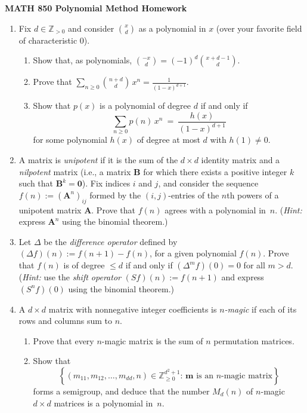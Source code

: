 \documentclass[11pt]{article}
\def\A{\mathbf{A}}
\def\B{\mathbf{B}}
\def\0{\mathbf{0}}
\def\Z{\mathbb{Z}}
\def\m{\mathbf{m}}
\begin{document}
\setlength{\parindent}{0pt}
\setlength{\parskip}{0.4cm}

\thispagestyle{empty} 

\begin{center} {\bf MATH 850 \qquad \qquad Polynomial Method Homework} \end{center} 

\begin{enumerate}[(1)]

\item Fix $d \in \Z_{ >0 }$ and consider $\binom x d$ as a polynomial in $x$ (over your favorite field of characteristic 0).
\begin{enumerate}
  \item Show that, as polynomials, $\binom {-x} d = (-1)^d \binom {x+d-1} d$.
  \item Prove that $\sum_{ n \ge 0 } \binom {n+d} d \, x^n = \frac{ 1 }{ (1-x)^{ d+1 } }$.
  \item Show that $p(x)$ is a polynomial of degree $d$ if and only if
  \[
    \sum_{ n \ge 0 } p(n) \, x^n \ = \ \frac{ h(x) }{ (1-x)^{ d+1 } } 
  \]
  for some polynomial $h(x)$ of degree at most $d$ with $h(1) \ne 0$.
\end{enumerate}

\item A matrix is \emph{unipotent} if it is the sum of the $d \times d$ identity matrix and a \emph{nilpotent}
matrix (i.e., a matrix $\B$ for which there exists a positive integer $k$ such that $\B^k = \0$).
Fix indices $i$ and $j$, and consider the sequence $f(n) := (\A^n)_{ ij }$ formed by the $(i,j)$-entries of the $n$th powers of a unipotent
matrix $\A$. 
Prove that $f(n)$ agrees with a polynomial in~$n$. 
(\emph{Hint:} express $\A^n$ using the binomial theorem.)

\item Let $\Delta$ be the \emph{difference operator} defined by $(\Delta f) (n) := f(n+1) - f(n)$, for a given polynomial $f(n)$.
Prove that $f(n)$ is of degree $\le d$ if and only if $(\Delta^m f)(0) = 0$ for all $m > d$.
(\emph{Hint:} use the \emph{shift operator} $(Sf)(n) := f(n+1)$ and express $(S^n f)(0)$ using the binomial theorem.) 

\item A $d \times d$ matrix with nonnegative integer coefficients is \emph{$n$-magic} if each of its rows and columns sum to $n$.
\begin{enumerate}
  \item Prove that every $n$-magic matrix is the sum of $n$ permutation matrices.
  \item Show that
  \[
    \left\{ (m_{ 11 }, m_{ 12 } , \dots, m_{ dd }, n) \in \Z_{ \ge 0 }^{ d^2+1 } : \, \m \text{ is an $n$-magic matrix} \right\} 
  \]
  forms a semigroup, and deduce that the number $M_d(n)$ of $n$-magic $d \times d$ matrices is a polynomial in~$n$.
\end{enumerate}


\end{enumerate}
\end{document}
